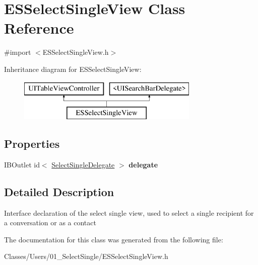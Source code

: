 \hypertarget{interface_e_s_select_single_view}{}\section{E\+S\+Select\+Single\+View Class Reference}
\label{interface_e_s_select_single_view}


{\ttfamily \#import $<$E\+S\+Select\+Single\+View.\+h$>$}

Inheritance diagram for E\+S\+Select\+Single\+View\+:\begin{figure}[H]
\begin{center}
\leavevmode
\includegraphics[height=2.000000cm]{interface_e_s_select_single_view}
\end{center}
\end{figure}
\subsection*{Properties}
\begin{DoxyCompactItemize}
\item 
\hypertarget{interface_e_s_select_single_view_ab99add3a7743e254c7295b1cb519833e}{}I\+B\+Outlet id$<$ \hyperlink{protocol_select_single_delegate-p}{Select\+Single\+Delegate} $>$ {\bfseries delegate}\label{interface_e_s_select_single_view_ab99add3a7743e254c7295b1cb519833e}

\end{DoxyCompactItemize}


\subsection{Detailed Description}
Interface declaration of the select single view, used to select a single recipient for a conversation or as a contact 

The documentation for this class was generated from the following file\+:\begin{DoxyCompactItemize}
\item 
Classes/\+Users/01\+\_\+\+Select\+Single/E\+S\+Select\+Single\+View.\+h\end{DoxyCompactItemize}
